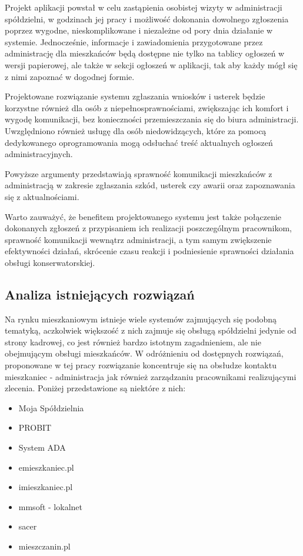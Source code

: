 Projekt aplikacji powstał w celu zastąpienia osobistej wizyty w  administracji spółdzielni, w godzinach jej pracy i możliwość dokonania dowolnego zgłoszenia poprzez wygodne, nieskomplikowane i niezależne od pory dnia działanie w systemie. Jednocześnie, informacje i zawiadomienia przygotowane przez administrację dla mieszkańców będą dostępne nie tylko na tablicy ogłoszeń w wersji papierowej, ale także w sekcji ogłoszeń w aplikacji, tak aby każdy mógł się z nimi zapoznać w dogodnej formie. 

Projektowane rozwiązanie systemu zgłaszania wniosków i usterek będzie korzystne również dla osób z niepełnosprawnościami, zwiększając ich komfort i wygodę komunikacji, bez konieczności przemieszczania się do biura administracji. Uwzględniono również usługę dla osób niedowidzących, które za pomocą dedykowanego oprogramowania mogą odsłuchać treść aktualnych ogłoszeń administracyjnych.

Powyższe argumenty przedstawiają sprawność komunikacji mieszkańców z administracją w zakresie zgłaszania szkód, usterek czy awarii oraz zapoznawania się z aktualnościami. 

Warto zauważyć, że benefitem projektowanego systemu jest także połączenie dokonanych zgłoszeń z przypisaniem ich realizacji poszczególnym pracownikom, sprawność komunikacji wewnątrz administracji, a tym samym zwiększenie efektywności działań, skrócenie czasu reakcji i podniesienie sprawności działania obsługi konserwatorskiej.
\subsection{Analiza istniejących rozwiązań}
Na rynku mieszkaniowym istnieje wiele systemów zajmujących się podobną tematyką, aczkolwiek większość z nich zajmuje się obsługą spółdzielni jedynie od strony kadrowej, co jest również bardzo istotnym zagadnieniem, ale nie obejmującym obsługi mieszkańców. W odróżnieniu od dostępnych rozwiązań,  proponowane w tej pracy rozwiązanie koncentruje się  na obsłudze kontaktu mieszkaniec - administracja jak również zarządzaniu pracownikami realizującymi zlecenia. Poniżej przedstawione są niektóre z nich: 
\begin{itemize}
    \item Moja Spółdzielnia
    \item PROBIT
    \item System ADA
    \item emieszkaniec.pl
    \item imieszkaniec.pl
    \item mmsoft - lokalnet
    \item sacer
    \item mieszczanin.pl
\end{itemize}